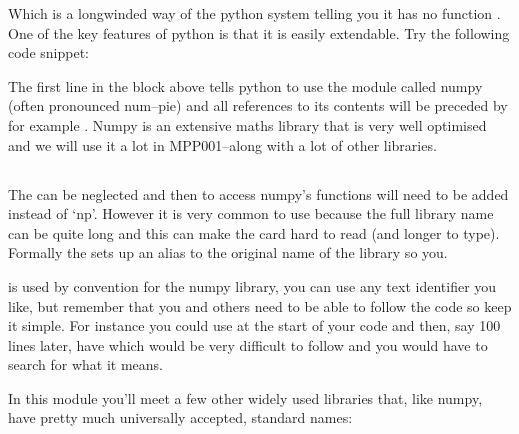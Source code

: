 \documentclass[letterpaper,10pt,english]{jupyterBook}
\begin{document}
\sphinxAtStartPar
Which is a longwinded way of the python system telling you it has no function . One of the key features of python is that it is easily extendable. Try the following code snippet:

\begin{sphinxVerbatim}[commandchars=\\\{\}]
   
\end{sphinxVerbatim}

\sphinxAtStartPar
The first line in the block above tells python to use the module called numpy (often pronounced num–pie) and all references to its contents will be preceded by  for example . Numpy is an extensive maths library that is very well optimised and we will use it a lot in MPP001–along with a lot of other libraries.


\subsection{}
\label{\detokenize{GettingStarted:as-library-name}}
\sphinxAtStartPar
The  can be neglected and then to access numpy’s functions  will need to be added instead of ‘np’. However it is very common to use  because the full library name can be quite long and this can make the card hard to read (and longer to type). Formally the  sets up an alias to the original name of the library so you.

\sphinxAtStartPar
{} is used by convention for the numpy library, you can use any text identifier you like, but remember that you and others need to be able to follow the code so keep it simple. For instance you could use  at the start of your code and then, say 100 lines later, have  which would be very difficult to follow and you would have to search for what it means.

\sphinxAtStartPar
In this module you’ll meet a few other widely used libraries that, like numpy, have pretty much universally accepted, standard names:
\end{document}
